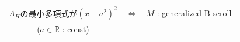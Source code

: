 \documentclass[dvipdfmx, xcolor=svgnames]{beamer}
\theoremstyle{plain}
\theoremstyle{definition}
\theoremstyle{remark}
\renewcommand{\arraystretch}{1.1}
\begin{document}
{\begin{theorem}

\begin{table}
  \begin{tabular}{cll}
    \(A_H\)の最小多項式が\((x-a^2)^2\)
    & \hspace{3pt}\(\Leftrightarrow\)
    & \(M\) : generalized B-scroll\\
    (\(a\in \mathbb{R}\) : const)
    &
    &
  \end{tabular}
\end{table}
\vspace{-5pt}
\end{theorem}
}
\end{document}
